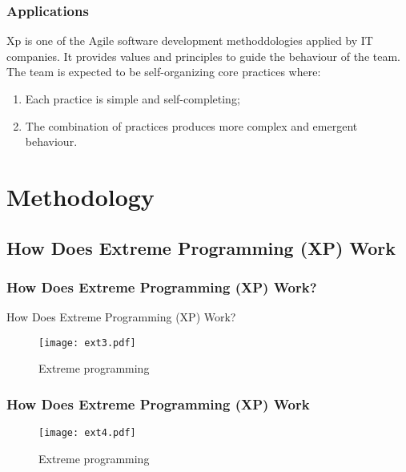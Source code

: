 \documentclass[	11pt, ]{beamer}
\begin{document}
\begin{frame}
	\frametitle{Applications}
		Xp is one of the Agile software development methoddologies applied by IT
companies. It provides values and principles to guide the behaviour of the team.
The team is expected to be self-organizing core practices where:
	\begin{enumerate}
		\item Each practice is simple and self-completing;
		\item The combination of practices produces more complex and emergent behaviour. 
	\end{enumerate}
	\bigskip %

\end{frame}

\section{Methodology}
\subsection{How Does Extreme Programming (XP) Work}
\begin{frame}
	\frametitle{How Does Extreme Programming (XP) Work?}
	How Does Extreme Programming (XP) Work?
	\bigskip %
	\begin{figure}
		\texttt{[image: ext3.pdf]}
		\caption{Extreme programming}
	\end{figure}
\end{frame}
\begin{frame}
	\frametitle{How Does Extreme Programming (XP) Work}
	\begin{figure}
		\texttt{[image: ext4.pdf]}
		\caption{Extreme programming}
	\end{figure}
\end{frame}
\end{document}
